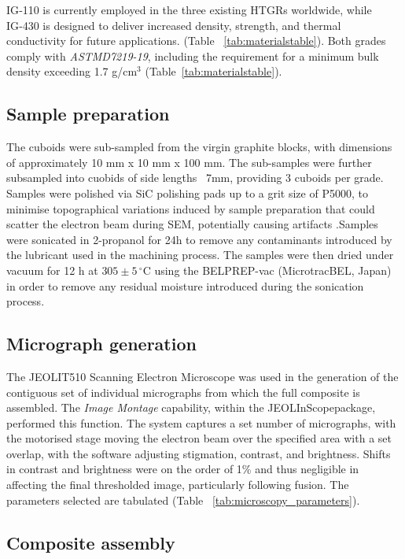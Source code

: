 \documentclass[3p,twocolumn]{elsarticle}
\begin{document}
IG‑110 is currently employed in the three existing HTGRs worldwide, while IG‑430 is
designed to deliver increased density, strength, and thermal conductivity for future
applications.\citep{toyotanso_atomic_nuclear} (Table ~\ref{tab:materialstable}).
Both grades comply with \textit{ASTMD7219-19}, including the requirement for
a minimum bulk density exceeding 1.7 g/cm$^3$ \citep{ASTMD7219-19} 
(Table~\ref{tab:materialstable}).

\subsection{Sample preparation}

The cuboids were sub-sampled from the virgin graphite blocks, with dimensions of
approximately 10 mm x 10 mm x 100 mm. The sub-samples were further subsampled into
cuobids of side lengths ~7mm, providing 3 cuboids per grade. Samples were polished
via SiC polishing pads up to a grit size of P5000, to minimise topographical variations
induced by sample preparation  that could scatter the electron beam during SEM, potentially
 causing artifacts \citep{Fang2022}.Samples were sonicated in 2-propanol for 24h to
remove any contaminants introduced by the lubricant used in the machining process.
 The samples were then dried under vacuum for 12 h at $305 \pm 5\,^\circ\mathrm{C}$ using
the BELPREP-vac (MicrotracBEL, Japan) in order to remove any residual moisture introduced
during the sonication process.

\subsection{Micrograph generation}
The JEOL\texttrademark IT510 Scanning Electron Microscope was used in the
generation of the contiguous set of individual micrographs from which the full
composite is assembled. The \textit{Image Montage} capability, within the
JEOLInScope\texttrademark package, performed this function. The system captures 
a set number of micrographs, with the motorised stage moving the electron beam over
the specified area with a set overlap, with the software adjusting stigmation, contrast,
and brightness. Shifts in contrast and brightness were on the order of 1\%  and thus negligible in affecting the final
thresholded image, particularly following fusion. The parameters selected are
tabulated (Table ~\ref{tab:microscopy_parameters}).

\subsection{Composite assembly}
\end{document}
